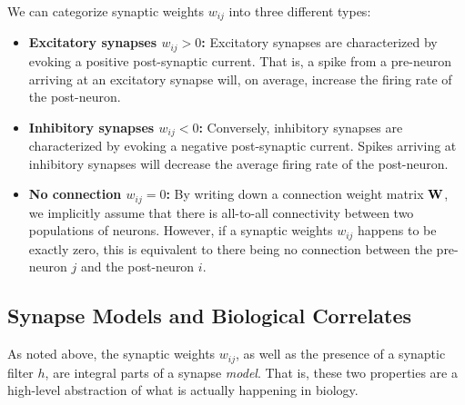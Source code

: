 \documentclass[10pt,letterpaper,oneside]{article}
\begin{document}
	We can categorize synaptic weights $w_{ij}$ into three different types:
	\begin{itemize}
		\item\textbf{Excitatory synapses $w_{ij} > 0$:}
		Excitatory synapses are characterized by evoking a positive post-synaptic current. That is, a spike from a pre-neuron arriving at an excitatory synapse will, on average, increase the firing rate of the post-neuron.
		\item\textbf{Inhibitory synapses $w_{ij} < 0$:}
		Conversely, inhibitory synapses are characterized by evoking a negative post-synaptic current. Spikes arriving at inhibitory synapses will decrease the average firing rate of the post-neuron.
		\item\textbf{No connection $w_{ij} = 0$:}
		By writing down a connection weight matrix ${\mathbf{W}}$, we implicitly assume that there is all-to-all connectivity between two populations of neurons. However, if a synaptic weights $w_{ij}$ happens to be exactly zero, this is equivalent to there being no connection between the pre-neuron $j$ and the post-neuron $i$.
	\end{itemize}


	\subsection{Synapse Models and Biological Correlates}

	As noted above, the synaptic weights $w_{ij}$, as well as the presence of a synaptic filter $h$, are integral parts of a synapse \emph{model}. That is, these two properties are a high-level abstraction of what is actually happening in biology.
\end{document}
